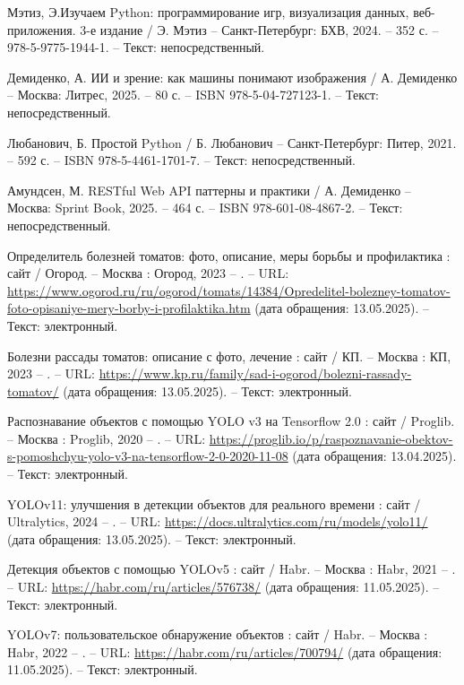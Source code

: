 \begin{thebibliography}{9}
     Мэтиз, Э.Изучаем Python: программирование игр, визуализация данных, веб-приложения. 3-е издание / Э. Мэтиз – Санкт-Петербург: БХВ, 2024. – 352 с. – 978-5-9775-1944-1. – Текст: непосредственный.
    
     Демиденко, А. ИИ и зрение: как машины понимают изображения / А. Демиденко – Москва: Литрес, 2025. – 80 с. – ISBN 978-5-04-727123-1. – Текст: непосредственный.
    
     Любанович, Б. Простой Python / Б. Любанович – Санкт-Петербург: Питер, 2021. – 592 с. – ISBN 978-5-4461-1701-7. – Текст: непосредственный.
    
     Амундсен, М. RESTful Web API паттерны и практики / А. Демиденко – Москва: Sprint Book, 2025. – 464 с. – ISBN 978-601-08-4867-2. – Текст: непосредственный.
    
	 Определитель болезней томатов: фото, описание, меры борьбы и профилактика : сайт / Огород. – Москва : Огород, 2023 – . – URL: \url{https://www.ogorod.ru/ru/ogorod/tomats/14384/Opredelitel-bolezney-tomatov-foto-opisaniye-mery-borby-i-profilaktika.htm} (дата обращения: 13.05.2025). – Текст: электронный.
	
	 Болезни рассады томатов: описание с фото, лечение : сайт / КП. – Москва : КП, 2023 – . – URL: \url{https://www.kp.ru/family/sad-i-ogorod/bolezni-rassady-tomatov/} (дата обращения: 13.05.2025). – Текст: электронный.

	 Распознавание объектов с помощью YOLO v3 на Tensorflow 2.0 : сайт / Proglib. – Москва : Proglib, 2020 – . – URL: \url{https://proglib.io/p/raspoznavanie-obektov-s-pomoshchyu-yolo-v3-na-tensorflow-2-0-2020-11-08} (дата обращения: 13.04.2025). – Текст: электронный.
	
	 YOLOv11: улучшения в детекции объектов для реального времени : сайт / Ultralytics, 2024 – . – URL: \url{https://docs.ultralytics.com/ru/models/yolo11/} (дата обращения: 13.05.2025). – Текст: электронный.
	
	 Детекция объектов с помощью YOLOv5 : сайт / Habr. – Москва : Habr, 2021 – . – URL: \url{https://habr.com/ru/articles/576738/} (дата обращения: 11.05.2025). – Текст: электронный.
	
	 YOLOv7: пользовательское обнаружение объектов : сайт / Habr. – Москва : Habr, 2022 – . – URL: \url{https://habr.com/ru/articles/700794/} (дата обращения: 11.05.2025). – Текст: электронный.
	

\end{thebibliography}
